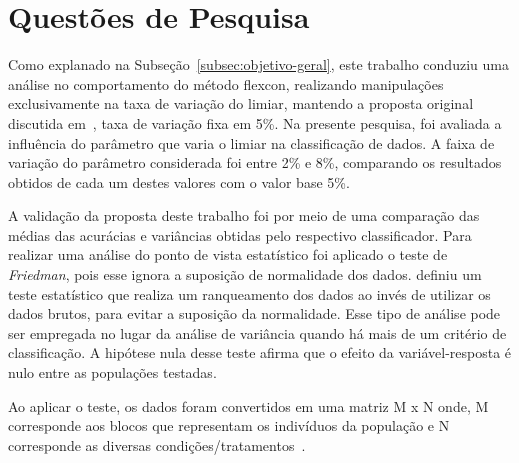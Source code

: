 
\section{Questões de Pesquisa}
    \label{sec:questoes-de-pesquisa}


    Como explanado na Subseção~\ref{subsec:objetivo-geral}, este trabalho conduziu uma análise no comportamento do método \ac{flexcon}, realizando manipulações exclusivamente na taxa de variação do limiar, mantendo a proposta original discutida em~\cite{vale2018selftraining}, taxa de variação fixa em 5\%. Na presente pesquisa, foi avaliada a influência do parâmetro que varia o limiar na classificação de dados. A faixa de variação do parâmetro considerada foi entre 2\% e 8\%, comparando os resultados obtidos de cada um destes valores com o valor base 5\%.

    A validação da proposta deste trabalho foi por meio de uma comparação das médias das acurácias e variâncias obtidas pelo respectivo classificador. Para realizar uma análise do ponto de vista estatístico foi aplicado o teste de \textit{Friedman}, pois esse ignora a suposição de normalidade dos dados.  definiu um teste estatístico que realiza um ranqueamento dos dados ao invés de utilizar os dados brutos, para evitar a suposição da normalidade. Esse tipo de análise pode ser empregada no lugar da análise de variância quando há mais de um critério de classificação. A hipótese nula desse teste afirma que o efeito da variável-resposta é nulo entre as populações testadas.

    Ao aplicar o teste, os dados foram convertidos em uma matriz M x N onde, M corresponde aos blocos que representam os indivíduos da população e N corresponde as diversas condições/tratamentos~\cite{pereira2015friedman}.


